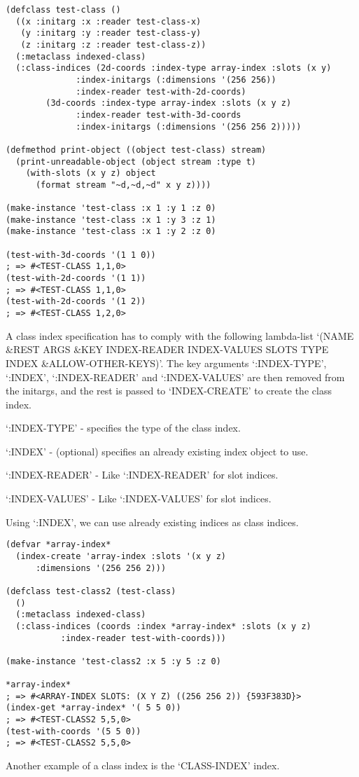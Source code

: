 \begin{Verbatim}[fontsize=\small,frame=leftline,framerule=0.9mm,rulecolor=\color{gray},framesep=5.1mm,xleftmargin=5mm,fontfamily=cmtt]
(defclass test-class ()
  ((x :initarg :x :reader test-class-x)
   (y :initarg :y :reader test-class-y)
   (z :initarg :z :reader test-class-z))
  (:metaclass indexed-class)
  (:class-indices (2d-coords :index-type array-index :slots (x y)
              :index-initargs (:dimensions '(256 256))
              :index-reader test-with-2d-coords)
        (3d-coords :index-type array-index :slots (x y z)
              :index-reader test-with-3d-coords
              :index-initargs (:dimensions '(256 256 2)))))

(defmethod print-object ((object test-class) stream)
  (print-unreadable-object (object stream :type t)
    (with-slots (x y z) object
      (format stream "~d,~d,~d" x y z))))

(make-instance 'test-class :x 1 :y 1 :z 0)
(make-instance 'test-class :x 1 :y 3 :z 1)
(make-instance 'test-class :x 1 :y 2 :z 0)

(test-with-3d-coords '(1 1 0))
; => #<TEST-CLASS 1,1,0>
(test-with-2d-coords '(1 1))
; => #<TEST-CLASS 1,1,0>
(test-with-2d-coords '(1 2))
; => #<TEST-CLASS 1,2,0>
\end{Verbatim}
A class index specification has to comply with the following
lambda-list `(NAME \&REST ARGS \&KEY INDEX-READER INDEX-VALUES SLOTS
TYPE INDEX \&ALLOW-OTHER-KEYS)'. The key arguments `:INDEX-TYPE',
`:INDEX', `:INDEX-READER' and `:INDEX-VALUES' are then removed from
the initargs, and the rest is passed to `INDEX-CREATE' to create
the class index.

`:INDEX-TYPE' - specifies the type of the class index.

`:INDEX' - (optional) specifies an already existing index object
to use.

`:INDEX-READER' - Like `:INDEX-READER' for slot
indices.

`:INDEX-VALUES' - Like `:INDEX-VALUES' for slot indices.

Using `:INDEX', we can use already existing indices as class
indices.

\begin{Verbatim}[fontsize=\small,frame=leftline,framerule=0.9mm,rulecolor=\color{gray},framesep=5.1mm,xleftmargin=5mm,fontfamily=cmtt]
(defvar *array-index*
  (index-create 'array-index :slots '(x y z)
      :dimensions '(256 256 2)))

(defclass test-class2 (test-class)
  ()
  (:metaclass indexed-class)
  (:class-indices (coords :index *array-index* :slots (x y z)
           :index-reader test-with-coords)))

(make-instance 'test-class2 :x 5 :y 5 :z 0)

*array-index*
; => #<ARRAY-INDEX SLOTS: (X Y Z) ((256 256 2)) {593F383D}>
(index-get *array-index* '( 5 5 0))
; => #<TEST-CLASS2 5,5,0>
(test-with-coords '(5 5 0))
; => #<TEST-CLASS2 5,5,0>
\end{Verbatim}
Another example of a class index is the `CLASS-INDEX' index.

